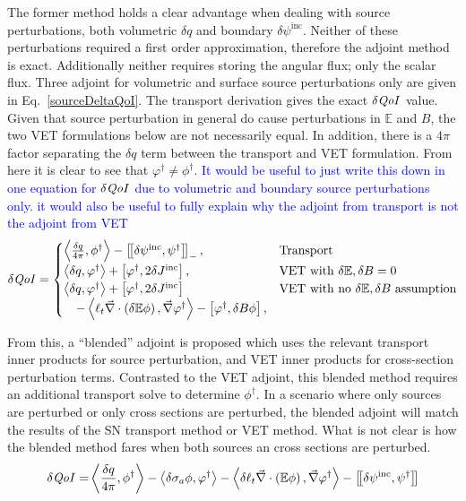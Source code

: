 \documentclass[12pt]{report}
\newcommand{\bra}{\left\langle}
\newcommand{\ket}{\right\rangle}
\newcommand{\sbraSN}{\left[ \! \left[}
\newcommand{\sketSN}{\right] \! \right]}
\newcommand{\sbra}{\left[}
\newcommand{\sket}{\right]}
\renewcommand{\div}{\vec{\nabla} \cdot}
\newcommand{\grad}{\vec{\nabla}}
\newcommand{\vefadj}{\varphi^\dag}
\newcommand{\Edd}{\mathbb{E}}
\newcommand{\BEdd}{B}
\newcommand{\siga}{\sigma_a}
\newcommand{\isigt}{\ell_t}
\newcommand{\angSourced}{\frac{\delta q}{4 \pi}}
\newcommand{\scalSource}{q}
\newcommand{\qoi}{{\it QoI}\xspace}
\newcommand{\comment}[2]{\marginpar{\textcolor{#2}{$\star$}}\textcolor{#2}{#1}\newline}
\newcommand{\jcr}[1]{\comment{#1}{blue}}
\newcommand{\jcr}[1]{\phantom{a}}
\begin{document}
The former method holds a clear advantage when dealing with source perturbations, both volumetric $\delta q$ and boundary $\delta \psi^\text{inc}$. Neither of these perturbations required a first order approximation, therefore the adjoint method is exact. Additionally neither requires storing the angular flux; only the scalar flux. Three adjoint for volumetric and surface source perturbations only are given in Eq.~\eqref{sourceDeltaQoI}. The transport derivation gives the exact $\delta \qoi$ value. Given that source perturbation in general do cause perturbations in $\Edd$ and $\BEdd$, the two VET formulations below are not necessarily equal. In addition, there is a $4 \pi$ factor separating the $\delta q$ term between the transport and VET formulation. From here it is clear to see that $\varphi^\dag \neq \phi^\dag$.
\jcr{It would be useful to just write this down in one equation for $\delta \qoi$ due to volumetric and boundary source perturbations only}. \jcr{it would also be useful to fully explain why the adjoint from transport is not the adjoint from VET}
\begin{equation}
\label{sourceDeltaQoI}
\delta \qoi = 
\begin{cases}
\bra \angSourced   , \phi^\dag  \ket - \sbraSN \delta \psi^{\text{inc}}, \psi^\dag \sketSN_- , & \text{Transport}  \\
\bra \delta \scalSource , \vefadj \ket + \sbra \vefadj, 2 \delta J^{\text{inc}} \sket, & \text{VET with $\delta \Edd, \delta B=0$} \\
\bra \delta \scalSource , \vefadj \ket + \sbra \vefadj, 2 \delta J^{\text{inc}} \sket  & \text{VET with no $\delta \Edd,\delta B$ assumption} \\
\quad - \bra  \isigt \div \left( \delta \Edd \phi \right), \grad \vefadj \ket - \sbra \vefadj, \delta \BEdd \phi \sket,  \\
\end{cases} 
\end{equation}

From this, a ``blended'' adjoint is proposed which uses the relevant transport inner products for source perturbation, and VET inner products for cross-section perturbation terms. Contrasted to the VET adjoint, this blended method requires an additional transport solve to determine $\phi^\dag$. In a scenario where only sources are perturbed or only cross sections are perturbed, the blended adjoint will match the results of the SN transport method or VET method. What is not clear is how the blended method fares when both sources an cross sections are perturbed.
\begin{equation}
\label{Blendsens}
\begin{split}
\delta \qoi =&  \bra \angSourced , \phi^\dag \ket - \bra \delta \siga \phi, \vefadj \ket - \bra \delta \isigt \div \left( \Edd \phi \right) , \grad \vefadj \ket
- \sbraSN \delta \psi^\text{inc}, \psi^\dag \sketSN \\
\end{split}
\end{equation}
\end{document}
